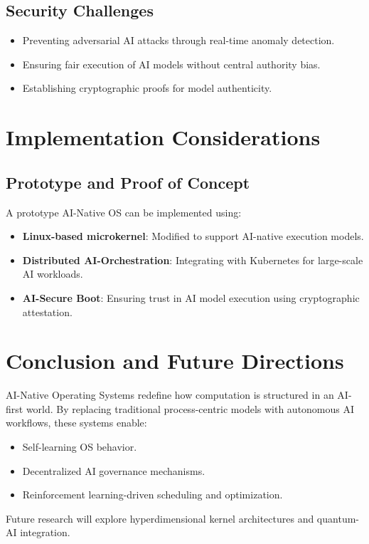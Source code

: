 \documentclass{article}
\begin{document}
\subsection{Security Challenges}
\begin{itemize}
    \item Preventing adversarial AI attacks through real-time anomaly detection.
    \item Ensuring fair execution of AI models without central authority bias.
    \item Establishing cryptographic proofs for model authenticity.
\end{itemize}

\section{Implementation Considerations}
\subsection{Prototype and Proof of Concept}
A prototype AI-Native OS can be implemented using:
\begin{itemize}
    \item \textbf{Linux-based microkernel}: Modified to support AI-native execution models.
    \item \textbf{Distributed AI-Orchestration}: Integrating with Kubernetes for large-scale AI workloads.
    \item \textbf{AI-Secure Boot}: Ensuring trust in AI model execution using cryptographic attestation.
\end{itemize}

\section{Conclusion and Future Directions}
AI-Native Operating Systems redefine how computation is structured in an AI-first world. By replacing traditional process-centric models with autonomous AI workflows, these systems enable:
\begin{itemize}
    \item Self-learning OS behavior.
    \item Decentralized AI governance mechanisms.
    \item Reinforcement learning-driven scheduling and optimization.
\end{itemize}
Future research will explore hyperdimensional kernel architectures and quantum-AI integration.



\end{document}
